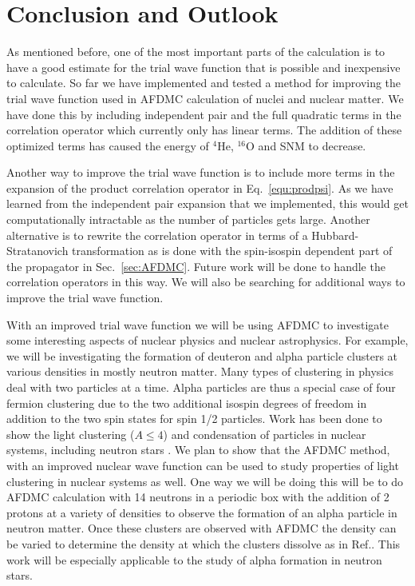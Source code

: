 \section{Conclusion and Outlook}
As mentioned before, one of the most important parts of the calculation is to have a good estimate for the trial wave function that is possible and inexpensive to calculate. So far we have implemented and tested a method for improving the trial wave function used in AFDMC calculation of nuclei and nuclear matter. We have done this by including independent pair and the full quadratic terms in the correlation operator which currently only has linear terms. The addition of these optimized terms has caused the energy of ${}^{4}$He, ${}^{16}$O and SNM to decrease.

Another way to improve the trial wave function is to include more terms in the expansion of the product correlation operator in Eq.~\ref{equ:prodpsi}. As we have learned from the independent pair expansion that we implemented, this would get computationally intractable as the number of particles gets large. Another alternative is to rewrite the correlation operator in terms of a Hubbard-Stratanovich transformation as is done with the spin-isospin dependent part of the propagator in Sec.~\ref{sec:AFDMC}. Future work will be done to handle the correlation operators in this way. We will also be searching for additional ways to improve the trial wave function.

With an improved trial wave function we will be using AFDMC to investigate some interesting aspects of nuclear physics and nuclear astrophysics. For example, we will be investigating the formation of deuteron and alpha particle clusters at various densities in mostly neutron matter. Many types of clustering in physics deal with two particles at a time. Alpha particles are thus a special case of four fermion clustering due to the two additional isospin degrees of freedom in addition to the two spin states for spin 1/2 particles. Work has been done to show the light clustering ($A\leq4$) and condensation of particles in nuclear systems, \cite{schuck2007,schuck2013_1,schuck2013_2} including neutron stars \cite{avancini2010,avancini2012,raduta2014}. We plan to show that the AFDMC method, with an improved nuclear wave function can be used to study properties of light clustering in nuclear systems as well. One way we will be doing this will be to do AFDMC calculation with 14 neutrons in a periodic box with the addition of 2 protons at a variety of densities to observe the formation of an alpha particle in neutron matter. Once these clusters are observed with AFDMC the density can be varied to determine the density at which the clusters dissolve as in Ref.\cite{avancini2012}. This work will be especially applicable to the study of alpha formation in neutron stars.

